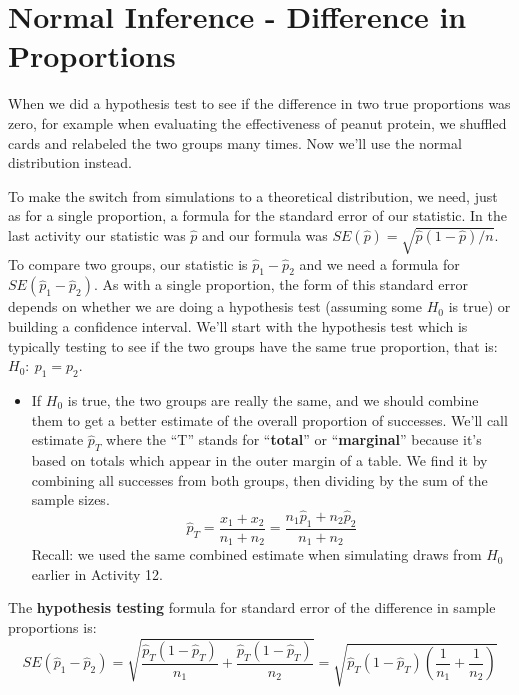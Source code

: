 \def\theTopic{Difference in Proportions - Z }
\def\dayNum{23 }


\section{Normal Inference - Difference in Proportions}



When we did a hypothesis test to see if the difference in  two true
proportions was zero,  for example when evaluating the effectiveness
of peanut protein, we shuffled cards and relabeled the two groups many
times. Now we'll use the normal distribution instead.  
  

 To make the switch from simulations to a theoretical distribution,
 we need, just as for a single proportion, a formula for the standard
 error of our statistic.  In the last activity our statistic was
 $\widehat{p}$ and our formula was $SE(\widehat{p}) =
 \sqrt{\widehat{p}(1-\widehat{p})/n}$.  To compare two groups, our 
statistic is $\widehat{p}_1 - \widehat{p}_2$ and we need a formula for
$SE(\widehat{p}_1 - \widehat{p}_2)$. As with a single proportion, the
form of this standard error depends on whether we are doing a
hypothesis test (assuming some $H_0$ is true) or building a confidence
interval.  We'll start with the hypothesis test which is typically
testing to see if the two groups have the same true proportion, that
is:  $H_0:\ p_1 = p_2$.
 \begin{itemize}
 \item If $H_0$ is true, the two groups are really the same, and we
   should combine them to get a better estimate of the overall
   proportion of successes. We'll call estimate $\widehat{p}_T$ where
   the ``T'' stands for ``{\bf total}'' or ``{\bf marginal}'' because it's
   based on totals which appear in the outer margin of a table.  We
   find it by combining all successes from both 
   groups, then dividing by the sum of the sample sizes. 
  $$\widehat{p}_T = \frac{x_1 + x_2}{n_1+n_2} = \frac{n_1\widehat{p}_1
    + n_2\widehat{p}_2}{n_1 + n_2}$$ 
  Recall:  we used the same combined estimate when simulating draws
  from $H_0$ earlier in Activity 12.
 \end{itemize}

 The {\bf hypothesis testing} formula for standard error of the
 difference in sample proportions is: 
 $$SE(\widehat{p}_1 - \widehat{p}_2) =
 \sqrt{\frac{\widehat{p}_T(1-\widehat{p}_T)}{n_1} +
   \frac{\widehat{p}_T(1-\widehat{p}_T)}{n_2}} =
  \sqrt{\widehat{p}_T(1-\widehat{p}_T)\left(\frac{1}{n_1} +
   \frac{1}{n_2}\right)}$$


